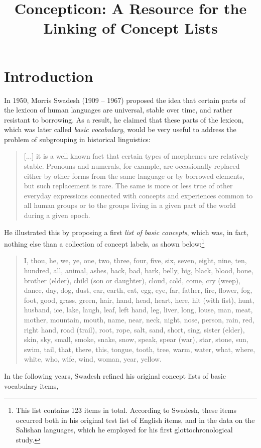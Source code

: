 \documentclass[10pt, a4paper]{article}
\title{Concepticon: A Resource for the Linking of Concept Lists}
\begin{document}
\maketitleabstract

\section{Introduction}
In 1950, Morris Swadesh (1909 -- 1967) proposed the idea that certain parts of the lexicon of human
languages are universal, stable over time, and rather resistant to borrowing. As a result, he
claimed that these
parts of the lexicon, which was later called \emph{basic vocabulary}, would be very
useful to address the problem of subgrouping in historical linguistics:
\begin{quote}
[...] it is a well known fact that certain types of morphemes are relatively stable. Pronouns and
numerals, for example, are occasionally replaced either by other forms from the same language or by
borrowed elements, but such replacement is rare. The same is more or less true of other everyday
expressions connected with concepts and experiences common to all human groups or to the groups
living in a given part of the world during a given epoch. \cite[157]{Swadesh1950}
\end{quote}
He illustrated this by proposing a first \emph{list of basic concepts}, which was, in fact, nothing
else than a collection of concept labels, as shown below:\footnote{This list contains 123 items in
total. According to Swadesh, these items occurred both in his original test list of English items,
and in the data on the Salishan languages, which he employed for his first glottochronological
study.}
\begin{quote}
I, thou, he, we, ye, one, two, three, four, five,
six, seven, eight, nine, ten, hundred, all,
animal, ashes, back, bad, bark, belly, big,
black, blood, bone, brother (elder), child
(son or daughter), cloud, cold, come, cry
(weep), dance, day, dog, dust, ear, earth, eat,
egg, eye, far, father, fire, flower, fog, foot,
good, grass, green, hair, hand, head, heart,
here, hit (with fist), hunt, husband, ice,
lake, laugh, leaf, left hand, leg, liver, long,
louse, man, meat, mother, mountain, mouth,
name, near, neck, night, nose, person, rain,
red, right hand, road (trail), root, rope, salt,
sand, short, sing, sister (elder), skin, sky,
small, smoke, snake, snow, speak, spear
(war), star, stone, sun, swim, tail, that, there,
this, tongue, tooth, tree, warm, water, what,
where, white, who, wife, wind, woman, year,
yellow. \cite[161]{Swadesh1950}
\end{quote}
In the following years, Swadesh refined his original concept lists of basic vocabulary items,
\end{document}
